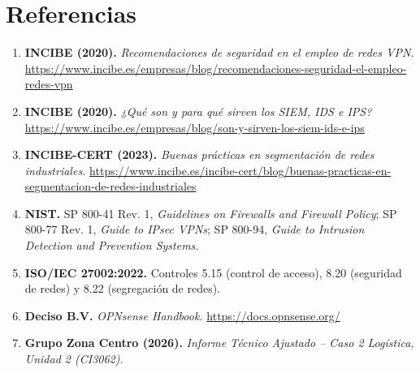 \documentclass[11pt,a4paper]{article}
\begin{document}
\section{Referencias}
\begin{enumerate}
\item \textbf{INCIBE (2020).} \textit{Recomendaciones de seguridad en el empleo de redes VPN.} \url{https://www.incibe.es/empresas/blog/recomendaciones-seguridad-el-empleo-redes-vpn}
\item \textbf{INCIBE (2020).} \textit{¿Qué son y para qué sirven los SIEM, IDS e IPS?} \url{https://www.incibe.es/empresas/blog/son-y-sirven-los-siem-ids-e-ips}
\item \textbf{INCIBE-CERT (2023).} \textit{Buenas prácticas en segmentación de redes industriales.} \url{https://www.incibe.es/incibe-cert/blog/buenas-practicas-en-segmentacion-de-redes-industriales}
\item \textbf{NIST.} SP 800-41 Rev. 1, \textit{Guidelines on Firewalls and Firewall Policy}; SP 800-77 Rev. 1, \textit{Guide to IPsec VPNs}; SP 800-94, \textit{Guide to Intrusion Detection and Prevention Systems}.
\item \textbf{ISO/IEC 27002:2022.} Controles 5.15 (control de acceso), 8.20 (seguridad de redes) y 8.22 (segregación de redes).
\item \textbf{Deciso B.V.} \textit{OPNsense Handbook.} \url{https://docs.opnsense.org/}
\item \textbf{Grupo Zona Centro (2026).} \textit{Informe Técnico Ajustado – Caso 2 Logística, Unidad 2 (CI3062).}
\end{enumerate}
\end{document}
